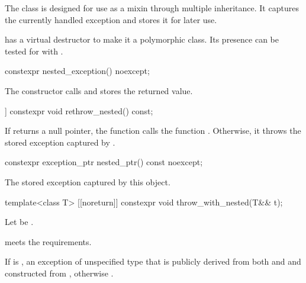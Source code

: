 \pnum
The class  is designed for use as a mixin through
multiple inheritance. It captures the currently handled exception and stores it
for later use.

\pnum
\begin{note}
 has a virtual destructor to make it a
polymorphic class. Its presence can be tested for with .
\end{note}

%
\begin{itemdecl}
constexpr nested_exception() noexcept;
\end{itemdecl}

\begin{itemdescr}
\pnum
\effects
The constructor calls  and stores the returned value.
\end{itemdescr}

%
\begin{itemdecl}
[[noreturn]] constexpr void rethrow_nested() const;
\end{itemdecl}

\begin{itemdescr}
\pnum
\effects
If  returns a null pointer, the function calls the function .
Otherwise, it throws the stored exception captured by .
\end{itemdescr}

%
\begin{itemdecl}
constexpr exception_ptr nested_ptr() const noexcept;
\end{itemdecl}

\begin{itemdescr}
\pnum
\returns
The stored exception captured by this  object.
\end{itemdescr}

%
\begin{itemdecl}
template<class T> [[noreturn]] constexpr void throw_with_nested(T&& t);
\end{itemdecl}

\begin{itemdescr}
\pnum
Let  be .

\pnum
\expects
{} meets the  requirements.

\pnum
\throws
If 
is ,
an exception of unspecified type that is publicly derived from both
 and 
and constructed from , otherwise
.
\end{itemdescr}


